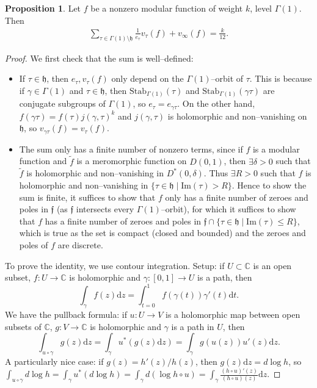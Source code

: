 \documentclass{article}
\theoremstyle{definition}
\newtheorem{prop}[theorem]{Proposition}
\begin{document}
\begin{prop}
    Let $f$ be a nonzero modular function of weight $k$, level $\Gamma(1)$. Then 
    \begin{align*}
        \sum_{ \tau \in \Gamma(1)\setminus \mathfrak{h}}^{} \frac{1}{e_{\tau}}v_\tau(f) + v_\infty(f) = \frac{k}{12}.
    \end{align*}
\end{prop}
\begin{proof}
    We first check that the sum is well--defined: 
    \begin{itemize}
        \item If $\tau \in \mathfrak{h}$, then $e_\tau, v_{\tau}(f)$ only depend on the $\Gamma(1)$--orbit of $\tau$. This is because if $\gamma \in \Gamma(1)$ and $\tau \in \mathfrak{h}$, then $\text{Stab}_{\Gamma(1)}(\tau)$ and $\text{Stab}_{\Gamma(1)}(\gamma \tau)$ are conjugate subgroups of $\Gamma(1)$, so $e_{\tau} = e_{\gamma \tau}$. On the other hand, $f(\gamma \tau) = f(\tau) j(\gamma, \tau)^k$ and $j(\gamma, \tau)$ is holomorphic and non--vanishing on $\mathfrak{h}$, so $v_{\gamma \tau}(f) = v_{\tau}(f)$.
        \item The sum only has a finite number of nonzero terms, since if $f$ is a modular function and $\tilde{f}$ is a meromorphic function on $D(0,1)$, then $\exists \delta > 0$ such that $\tilde{f}$ is holomorphic and non--vanishing in $D^*(0,\delta)$. Thus $\exists R > 0$ such that $f$ is holomorphic and non--vanishing in $\{\tau \in \mathfrak{h} \mid \text{Im}(\tau)>R\}$. Hence to show the sum is finite, it suffices to show that $f$ only has a finite number of zeroes and poles in $\mathfrak{f}$ (as $\mathfrak{f}$ intersects every $\Gamma(1)$--orbit), for which it suffices to show that $f$ has a finite number of zeroes and poles in $\mathfrak{f} \cap \{\tau \in \mathfrak{h} \mid  \text{Im}(\tau)\le R\}$, which is true as the set is compact (closed and bounded) and the zeroes and poles of $f$ are discrete.
    \end{itemize}
    To prove the identity, we use contour integration. Setup: if $U \subset \mathbb{C}$ is an open subset, $f : U \to \mathbb{C}$ is holomorphic and $\gamma:[0,1] \to U$ is a path, then $$\int_{\gamma}^{} f(z)\mathrm{d}z = \int_{t=0}^{1} f(\gamma(t))\gamma'(t)\mathrm{d}t.$$ We have the pullback formula: if $u : U \to V$ is a holomorphic map between open subsets of $\mathbb{C}$, $g : V \to \mathbb{C}$ is holomorphic and $\gamma$ is a path in $U$, then $$\int_{u \circ \gamma}^{} g(z)\mathrm{d}z = \int_{\gamma}^{} u^*(g(z)\mathrm{d}z) = \int_{\gamma}^{} g(u(z))u'(z)\mathrm{d}z.$$ A particularly nice case: if $g(z)=h'(z)/h(z)$, then $g(z)\mathrm{d}z = d \log h$, so $\int_{u \circ \gamma}^{}d \log h = \int_{\gamma}^{} u^*(d \log h) = \int_{\gamma}^{} d(\log h \circ u) = \int_{\gamma}^{} \frac{(h \circ u)'(z)}{(h \circ u)(z)}\mathrm{d}z$.
    \vspace{1mm}
     

\end{proof}
\end{document}
